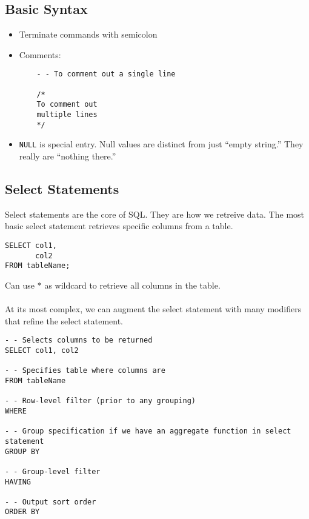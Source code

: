 \documentclass[12pt]{article}
\theoremstyle{plain}
\theoremstyle{definition}
\theoremstyle{remark}
\begin{document}


\clearpage
\subsection{Basic Syntax}
\begin{itemize}
  \item Terminate commands with semicolon

  \item Comments:
    \begin{lstlisting}
    - - To comment out a single line

    /*
    To comment out
    multiple lines
    */
    \end{lstlisting}

  \item \texttt{NULL} is special entry.
    Null values are distinct from just ``empty string.''
    They really are ``nothing there.''

\end{itemize}


\subsection{Select Statements}

Select statements are the core of SQL.
They are how we retreive data.
The most basic select statement retrieves specific columns from a table.
\begin{lstlisting}
SELECT col1,
       col2
FROM tableName;
\end{lstlisting}
Can use $*$ as wildcard to retrieve all columns in the table.
\\
\\
At its most complex, we can augment the select statement with many
modifiers that refine the select statement.
\begin{lstlisting}
- - Selects columns to be returned
SELECT col1, col2

- - Specifies table where columns are
FROM tableName

- - Row-level filter (prior to any grouping)
WHERE

- - Group specification if we have an aggregate function in select statement
GROUP BY

- - Group-level filter
HAVING

- - Output sort order
ORDER BY
\end{lstlisting}
\end{document}
